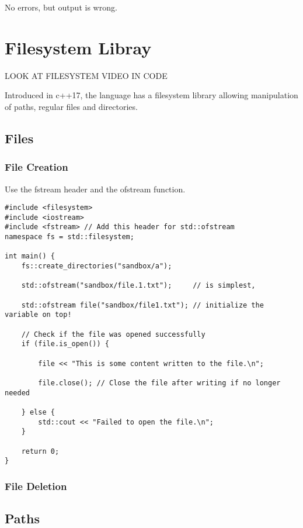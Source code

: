\documentclass[openany]{report}
\begin{document}
No errors, but output is wrong. 


\chapter{Filesystem Libray}

LOOK AT FILESYSTEM VIDEO IN CODE

Introduced in c++17, the language has a filesystem library allowing
manipulation of paths, regular files and directories.

\section{Files}

\subsection{File Creation}

Use the fstream header and the ofstream function.

\begin{verbatim}
#include <filesystem>
#include <iostream>
#include <fstream> // Add this header for std::ofstream
namespace fs = std::filesystem;

int main() {
    fs::create_directories("sandbox/a");

    std::ofstream("sandbox/file.1.txt");     // is simplest,

    std::ofstream file("sandbox/file1.txt"); // initialize the variable on top!

    // Check if the file was opened successfully
    if (file.is_open()) {

        file << "This is some content written to the file.\n";

        file.close(); // Close the file after writing if no longer needed

    } else {
        std::cout << "Failed to open the file.\n";
    }

    return 0;
}
\end{verbatim}


\subsection{File Deletion}

\section{Paths}
\end{document}

